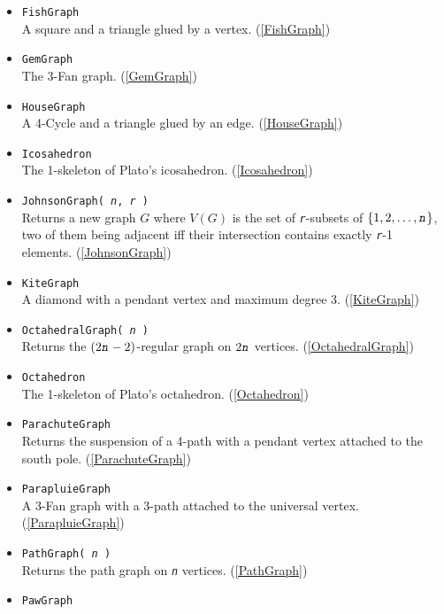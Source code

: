 \documentclass[a4paper,11pt]{report}
\begin{document}
{{\begin{itemize}
 Returns the \mbox{\texttt{\mdseries\slshape n}}-Fan: The join of a vertex and a (\mbox{\texttt{\mdseries\slshape n}}+1)-path. (\ref{FanGraph}) 
\item \texttt{FishGraph}\\
 A square and a triangle glued by a vertex. (\ref{FishGraph}) 
\item \texttt{GemGraph}\\
 The 3-Fan graph. (\ref{GemGraph}) 
\item \texttt{HouseGraph}\\
 A 4-Cycle and a triangle glued by an edge. (\ref{HouseGraph}) 
\item \texttt{Icosahedron}\\
 The 1-skeleton of Plato's icosahedron. (\ref{Icosahedron}) 
\item \texttt{JohnsonGraph( \mbox{\texttt{\mdseries\slshape n}}, \mbox{\texttt{\mdseries\slshape r}} )}\\
 Returns a new graph $G$ where $V(G)$ is the set of \mbox{\texttt{\mdseries\slshape r}}-subsets of $\{1, 2, \ldots, \mbox{\texttt{\mdseries\slshape n}}\}$, two of them being adjacent iff their intersection contains exactly \mbox{\texttt{\mdseries\slshape r}}-1 elements. (\ref{JohnsonGraph}) 
\item \texttt{KiteGraph}\\
 A diamond with a pendant vertex and maximum degree 3. (\ref{KiteGraph}) 
\item \texttt{OctahedralGraph( \mbox{\texttt{\mdseries\slshape n}} )}\\
 Returns the $(2\mbox{\texttt{\mdseries\slshape n}}-2)$-regular graph on $2\mbox{\texttt{\mdseries\slshape n}}$ vertices. (\ref{OctahedralGraph}) 
\item \texttt{Octahedron}\\
 The 1-skeleton of Plato's octahedron. (\ref{Octahedron}) 
\item \texttt{ParachuteGraph}\\
 Returns the suspension of a 4-path with a pendant vertex attached to the south
pole. (\ref{ParachuteGraph}) 
\item \texttt{ParapluieGraph}\\
 A 3-Fan graph with a 3-path attached to the universal vertex. (\ref{ParapluieGraph}) 
\item \texttt{PathGraph( \mbox{\texttt{\mdseries\slshape n}} )}\\
 Returns the path graph on \mbox{\texttt{\mdseries\slshape n}} vertices. (\ref{PathGraph}) 
\item \texttt{PawGraph}\\

\end{itemize}}}
\end{document}
